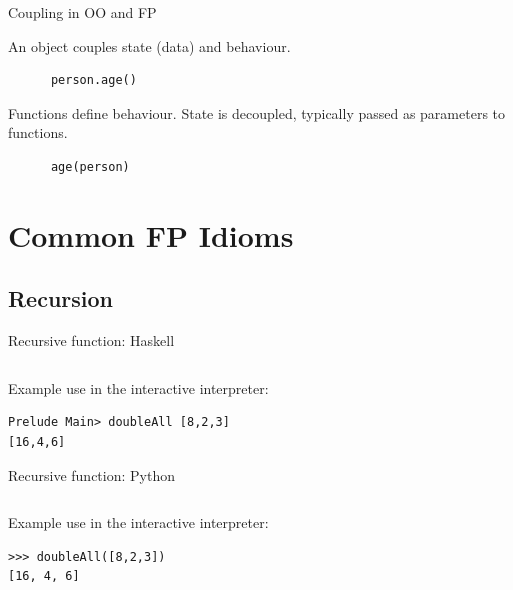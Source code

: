 \documentclass{beamer}
\begin{document}
\begin{frame}[fragile]{Coupling in OO and FP}

  \begin{description}[<+->]
  \item[OO] An object couples state (data) and behaviour.
    \begin{lstlisting}
      person.age()
    \end{lstlisting}
  \item[FP] Functions define behaviour. State is decoupled, typically
    passed as parameters to functions.
    \begin{lstlisting}
      age(person)
    \end{lstlisting}
  \end{description}

\end{frame}

\section{Common FP Idioms}
\subsection{Recursion}


\begin{frame}[fragile]{Recursive function: Haskell}

  \inputminted[firstline=3,lastline=5]{haskell}{code/doubleall_recursion.hs}

  \vskip5mm

Example use in the interactive interpreter:
  \begin{verbatim}
Prelude Main> doubleAll [8,2,3]
[16,4,6]
  \end{verbatim}

\end{frame}

\begin{frame}[fragile]{Recursive function: Python}

  \inputminted[firstline=3]{python}{code/doubleall_recursion.py}

  \vskip5mm

Example use in the interactive interpreter:

  \begin{verbatim}
>>> doubleAll([8,2,3])
[16, 4, 6]
  \end{verbatim}

\end{frame}
\end{document}
